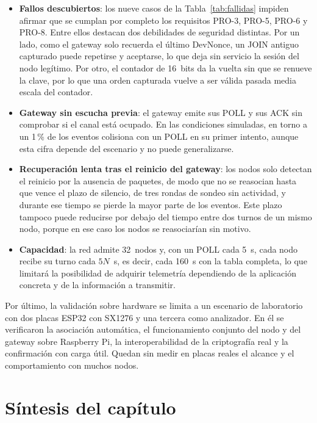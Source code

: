 \begin{itemize}

\item \textbf{Fallos descubiertos}: los nueve casos de la Tabla~\ref{tab:fallidas} impiden afirmar que se cumplan por completo los requisitos PRO-3, PRO-5, PRO-6 y PRO-8. Entre ellos destacan dos debilidades de seguridad distintas. Por un lado, como el gateway solo recuerda el último DevNonce, un JOIN antiguo capturado puede repetirse y aceptarse, lo que deja sin servicio la sesión del nodo legítimo. Por otro, el contador de 16~bits da la vuelta sin que se renueve la clave, por lo que una orden capturada vuelve a ser válida pasada media escala del contador.

\item \textbf{Gateway sin escucha previa}: el gateway emite sus POLL y sus ACK sin comprobar si el canal está ocupado. En las condiciones simuladas, en torno a un 1\,\% de los eventos colisiona con un POLL en su primer intento, aunque esta cifra depende del escenario y no puede generalizarse.

\item \textbf{Recuperación lenta tras el reinicio del gateway}: los nodos solo detectan el reinicio por la ausencia de paquetes, de modo que no se reasocian hasta que vence el plazo de silencio, de tres rondas de sondeo sin actividad, y durante ese tiempo se pierde la mayor parte de los eventos. Este plazo tampoco puede reducirse por debajo del tiempo entre dos turnos de un mismo nodo, porque en ese caso los nodos se reasociarían sin motivo.

\item \textbf{Capacidad}: la red admite 32~nodos y, con un POLL cada 5~s, cada nodo recibe su turno cada $5N$~s, es decir, cada 160~s con la tabla completa, lo que limitará la posibilidad de adquirir telemetría dependiendo de la aplicación concreta y de la información a transmitir.
\end{itemize}

Por último, la validación sobre hardware se limita a un escenario de laboratorio con dos placas ESP32 con SX1276 y una tercera como analizador. En él se verificaron la asociación automática, el funcionamiento conjunto del nodo y del gateway sobre Raspberry Pi, la interoperabilidad de la criptografía real y la confirmación con carga útil. Quedan sin medir en placas reales el alcance y el comportamiento con muchos nodos.

\section{Síntesis del capítulo}


